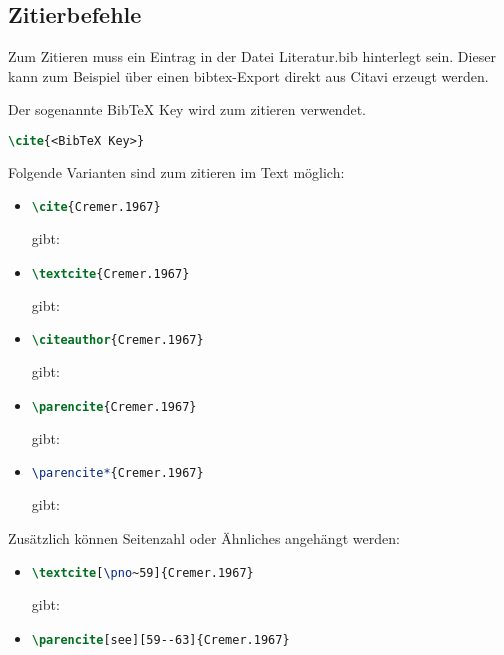 \subsection{Zitierbefehle}
\label{sec:Beispiele_Zitierbefehle}
%
Zum Zitieren muss ein Eintrag in der Datei Literatur.bib hinterlegt sein.
Dieser kann zum Beispiel über einen bibtex-Export direkt aus Citavi erzeugt werden.
\par
Der sogenannte BibTeX Key wird zum zitieren verwendet.
%
\begin{lstlisting}[language=tex]
\cite{<BibTeX Key>}
\end{lstlisting}
%
Folgende Varianten sind zum zitieren im Text möglich:
%
\begin{itemize}
    \item 
\begin{lstlisting}[language=tex]
\cite{Cremer.1967}
\end{lstlisting}
gibt: \cite{Cremer.1967}\\
%
    \item 
\begin{lstlisting}[language=tex]
\textcite{Cremer.1967}
\end{lstlisting}
gibt: \textcite{Cremer.1967}\\
%
    \item 
\begin{lstlisting}[language=tex]
\citeauthor{Cremer.1967}
\end{lstlisting}
gibt: \citeauthor{Cremer.1967}\\
%
    \item 
\begin{lstlisting}[language=tex]
\parencite{Cremer.1967}
\end{lstlisting}
gibt: \parencite{Cremer.1967}\\
%
    \item 
\begin{lstlisting}[language=tex]
\parencite*{Cremer.1967}
\end{lstlisting}
gibt: \parencite*{Cremer.1967}\\
%
\end{itemize}
%
\par
Zusätzlich können Seitenzahl oder Ähnliches angehängt werden:
\begin{itemize}
    \item 
\begin{lstlisting}[language=tex]
\textcite[\pno~59]{Cremer.1967}
\end{lstlisting}
gibt:  \textcite[\pno~59]{Cremer.1967}\\
%
    \item 
\begin{lstlisting}[language=tex]
\parencite[see][59--63]{Cremer.1967}
\end{lstlisting} 
\parencite[see][59--63]{Cremer.1967}\\
%
\end{itemize}
